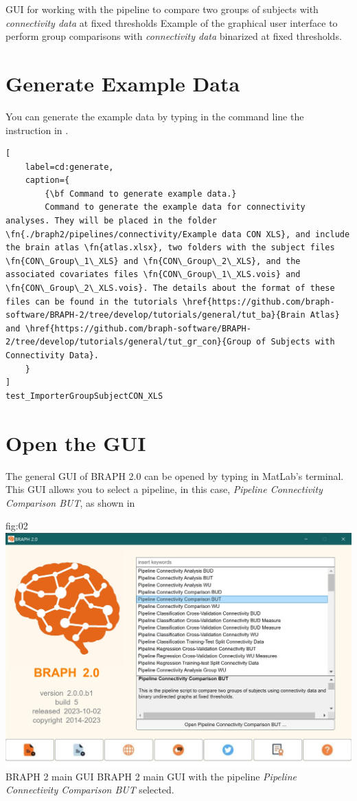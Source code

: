 \documentclass[justified]{tufte-handout}
\begin{document}
	{GUI for working with the pipeline to compare two groups of subjects with \emph{connectivity data} at fixed thresholds}
	{
	Example of the graphical user interface to perform group comparisons with \emph{connectivity data} binarized at fixed thresholds.
	}
	
\tableofcontents

\clearpage
\section{Generate Example Data}

You can generate the example data by typing in the command line the instruction in .
%
\begin{lstlisting}[
	label=cd:generate,
	caption={
		{\bf Command to generate example data.}
		Command to generate the example data for connectivity analyses. They will be placed in the folder \fn{./braph2/pipelines/connectivity/Example data CON XLS}, and include the brain atlas \fn{atlas.xlsx}, two folders with the subject files \fn{CON\_Group\_1\_XLS} and \fn{CON\_Group\_2\_XLS}, and the associated covariates files \fn{CON\_Group\_1\_XLS.vois} and \fn{CON\_Group\_2\_XLS.vois}. The details about the format of these files can be found in the tutorials \href{https://github.com/braph-software/BRAPH-2/tree/develop/tutorials/general/tut_ba}{Brain Atlas} and \href{https://github.com/braph-software/BRAPH-2/tree/develop/tutorials/general/tut_gr_con}{Group of Subjects with Connectivity Data}.
	}
]
test_ImporterGroupSubjectCON_XLS
\end{lstlisting}

\section{Open the GUI}

The general GUI of BRAPH 2.0 can be opened by typing  in MatLab's terminal. This GUI allows you to select a pipeline, in this case, \emph{Pipeline Connectivity Comparison BUT}, as shown in 

	{fig:02}
	{
	\includegraphics{fig02.jpg}
	}
	{BRAPH 2 main GUI}
	{
	BRAPH 2 main GUI with the pipeline \emph{Pipeline Connectivity Comparison BUT} selected.
	}
\end{document}
